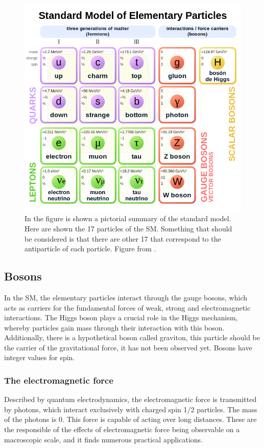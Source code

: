 \begin{figure}[!htb]
\centering
\includegraphics[scale=0.5]{Figures/Chapter1/Standard_Model_of_Elementary_Particles.png}

        \caption{In the figure is shown a pictorial summary of the standard model. Here are shown the 17 particles of the SM. Something that should be considered is that there are other 17 that correspond to the antiparticle of each particle. Figure from \cite{SM_Table}.} 
\label{fig:SM}
\end{figure}
 
\subsection{Bosons}
In the SM, the elementary particles interact through the gauge bosons, which acts as carriers for the fundamental forces of weak, strong and electromagnetic interactions. The Higgs boson plays a crucial role in the Higgs mechanism, whereby particles gain mass through their interaction with this boson. Additionally, there is a hypothetical boson called graviton, this particle should be the carrier of the gravitational force, it has not been observed yet. Bosons have integer values for spin.  

\subsubsection{The electromagnetic force}
Described by quantum electrodynamics, the electromagnetic force is transmitted by photons, which interact exclusively with charged spin 1/2 particles. The mass of the photons is 0. This force is capable of acting over long distances. These are the responsible of the effects of electromagnetic force being observable on a macroscopic scale, and it finds numerous practical applications.

